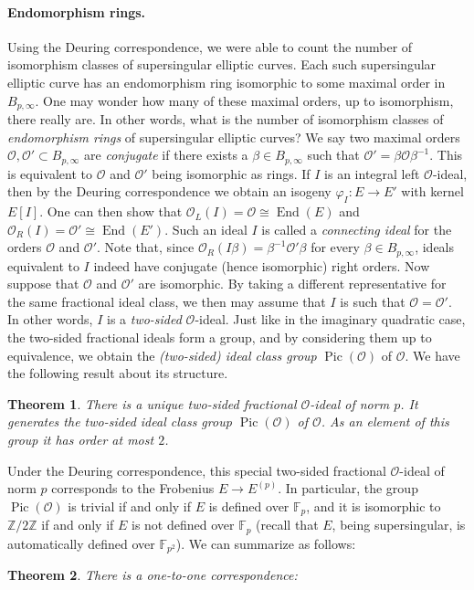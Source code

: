 \documentclass[10pt]{article}
\theoremstyle{plain}
\newtheorem{theorem}{Theorem}
\theoremstyle{definition}
\DeclareMathOperator{\End}{End} %
\DeclareMathOperator{\Pic}{Pic} %
\def\F{\ensuremath{\mathbb{F}}}
\def\Z{\ensuremath{\mathbb{Z}}}
\def\O{\ensuremath{\mathcal{O}}}
\begin{document}
\begin{prposition}
\paragraph{Endomorphism rings.}
Using the Deuring correspondence, we were able to count the
number of isomorphism classes of supersingular elliptic curves.
Each such supersingular elliptic curve has an endomorphism ring
isomorphic to some maximal order in $B_{p,\infty}$.
One may wonder how many of these maximal orders, up to isomorphism,
there really are. In other words,
what is the number of isomorphism classes of \emph{endomorphism rings}
of supersingular elliptic curves?
We say two maximal orders $\O,\O'\subset B_{p,\infty}$
are \emph{conjugate} if there exists a $\beta\in B_{p,\infty}$ such
that $\O' = \beta\O\beta^{-1}$. This is equivalent to $\O$ and $\O'$
being isomorphic as rings.
If $I$ is an integral left $\O$-ideal, then by the Deuring
correspondence we obtain an isogeny $\varphi_I : E\to E'$
with kernel $E[I]$.
One can then show that $\O_L(I)=\O\cong\End(E)$
and $\O_R(I)=\O'\cong\End(E')$.
Such an ideal $I$ is called a \emph{connecting ideal}
for the orders $\O$ and $\O'$. 
Note that, since $\O_R(I\beta)=\beta^{-1}\O'\beta$ for every
$\beta\in B_{p,\infty}$, ideals equivalent to $I$ indeed
have conjugate (hence isomorphic) right orders.
Now suppose that $\O$ and $\O'$ are isomorphic. By taking a different
representative for the same fractional ideal class,
we then may assume that $I$ is such that $\O=\O'$.
In other words, $I$ is a \emph{two-sided}
$\O$-ideal. Just like in the imaginary quadratic case, the
two-sided fractional ideals form a group, and by considering them up to
equivalence, we obtain the \emph{(two-sided) ideal class group}
$\Pic(\O)$ of $\O$.
We have the following result about its structure.
\begin{theorem}
There is a unique two-sided fractional $\O$-ideal of norm $p$.
It generates the two-sided ideal class group $\Pic(\O)$ of $\O$.
As an element of this group it has order at most $2$.
\end{theorem}
Under the Deuring correspondence, this special two-sided fractional
$\O$-ideal of norm $p$
corresponds to the Frobenius $E\to E^{(p)}$.
In particular, the group $\Pic(\O)$ is trivial if and only if $E$ is
defined over $\F_p$, and it is isomorphic to $\Z/2\Z$ if and only if
$E$ is not defined over $\F_p$ (recall that $E$, being supersingular,
is automatically defined over $\F_{p^2}$).
We can summarize as follows:
\begin{theorem}
There is a one-to-one correspondence:

\end{theorem}
\end{prposition}
\end{document}
